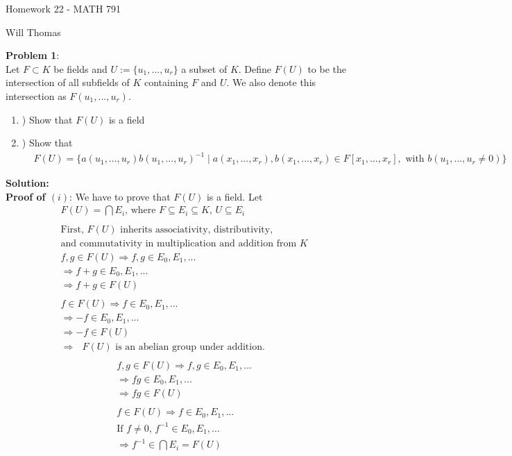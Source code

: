 \documentclass[11pt]{article}
\newcommand{\prob}[3]{\begin{flushleft}
        \textbf{Problem #1}: \\
        #2 
		\textbf{Solution:}\\ 
		#3

\end{flushleft}}
\newcommand{\makeHWtitle}[1]{
    \begin{center}
    \Large{Homework #1 - MATH 791} 
        \vspace{5pt}
        
        \normalsize{Will Thomas}
        \vspace{5pt}
    \end{center}
}
\begin{document}
\makeHWtitle{22}
\prob{1}{
Let $F \subset K$ be fields and $U := \{u_1, ..., u_r\}$ a subset of $K$. Define $F(U)$ to be the intersection of all subfields of $K$ containing $F$ and $U$. We also denote this intersection as $F(u_1, ..., u_r)$.
\begin{enumerate}[i]
\item) Show that $F(U)$ is a field\\
\item) Show that 
\begin{align*}
&F(U) = \{a(u_1, ..., u_r)b(u_1, ..., u_r)^{-1} \mid a(x_1, ..., x_r), b(x_1, ..., x_r) \in F[x_1, ..., x_r], \text{ with } b(u_1, ..., u_r \neq 0)\}
\end{align*}
\end{enumerate}
}
{
\textbf{Proof of $(i)$}:
\newline
We have to prove that $F(U)$ is a field. Let 
\begin{align*}
&F(U) = \bigcap E_i \text{, where } F \subseteq E_i \subseteq K \text{, } U \subseteq E_i\\
&\\
&\text{First, $F(U)$ inherits associativity, distributivity, }\\
&\text{and commutativity in multiplication and addition from $K$}\\
&f, g \in F(U) \Rightarrow f, g \in E_0, E_1, ...\\
&\Rightarrow f+g \in E_0, E_1, ...\\
&\Rightarrow f+g \in F(U)\\
&\\
&f \in F(U) \Rightarrow f \in E_0, E_1, ...\\
&\Rightarrow -f \in E_0, E_1, ...\\
&\Rightarrow -f \in F(U)\\
&\Rightarrow \text{ $F(U) $ is an abelian group under addition.}\\
\end{align*}
\begin{align*}
&f, g \in F(U) \Rightarrow f, g \in E_0, E_1, ...\\
&\Rightarrow fg \in E_0, E_1, ...\\
&\Rightarrow fg \in F(U)\\
&\\
&f \in F(U) \Rightarrow f \in E_0, E_1, ...\\
&\text{If $f \neq 0$, } f^{-1} \in E_0, E_1, ...\\
&\Rightarrow f^{-1} \in \bigcap E_i = F(U)\\

\end{align*}}
\end{document}
